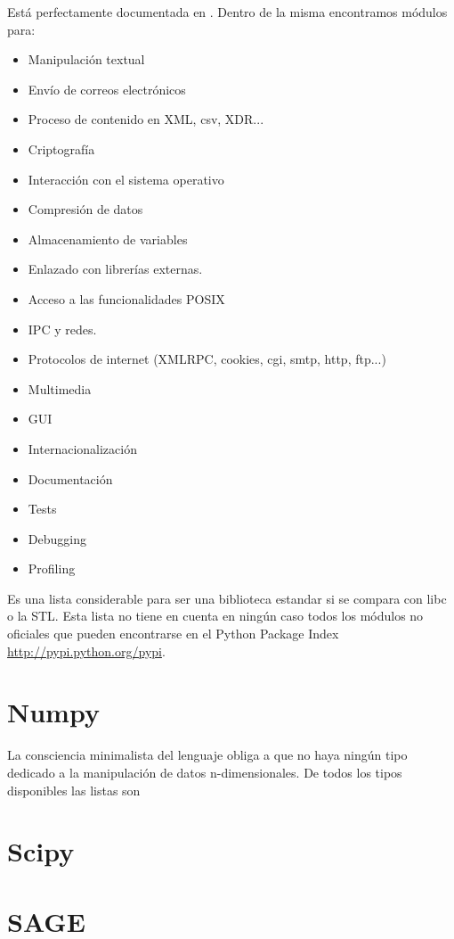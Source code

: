 \documentclass[a4paper,10pt]{article}
\begin{document}
Está perfectamente documentada en \cite{STB}. Dentro de la misma
encontramos módulos para:

\begin{itemize}
\item Manipulación textual
\item Envío de correos electrónicos
\item Proceso de contenido en XML, csv, XDR...
\item Criptografía
\item Interacción con el sistema operativo
\item Compresión de datos
\item Almacenamiento de variables
\item Enlazado con librerías externas.
\item Acceso a las funcionalidades POSIX
\item IPC y redes.
\item Protocolos de internet (XMLRPC, cookies, cgi, smtp, http, ftp...)
\item Multimedia
\item GUI
\item Internacionalización
\item Documentación
\item Tests
\item Debugging
\item Profiling
\end{itemize}

Es una lista considerable para ser una biblioteca estandar si se
compara con libc o la STL.  Esta lista no tiene en cuenta en ningún
caso todos los módulos no oficiales que pueden encontrarse en el
Python Package Index \url{http://pypi.python.org/pypi}.
\section{Numpy}

La consciencia minimalista del lenguaje obliga a que no haya ningún
tipo dedicado a la manipulación de datos n-dimensionales. De todos los
tipos disponibles las listas son 

\section{Scipy}

\section{SAGE}
\end{document}
